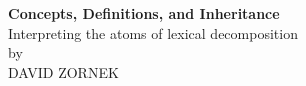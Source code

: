 \documentclass[11pt,twoside]{article}
\begin{document}
\onehalfspacing
\vspace{5cm}
\begin{center}
\Large \textbf{Concepts, Definitions, and Inheritance} \\[1ex]
\normalsize  Interpreting the atoms of lexical decomposition\\[.6ex]
\normalsize by \\[.6ex]
{\scshape DAVID ZORNEK}
\end{center}
\clearpage












\end{document}
